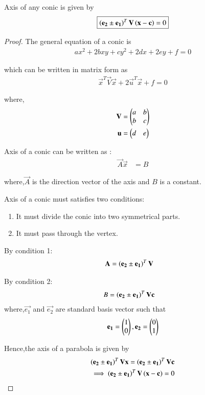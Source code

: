 \documentclass[journal,12pt,twocolumn]{IEEEtran}
\begin{document}
\begin{lemma}
Axis of any conic is given by
\begin{align}
    \boxed{\left(\mathbf{e_2} \pm \mathbf{e_1}\right)^T\mathbf{V}\left(\mathbf{x}-\mathbf{c}\right) = 0}
\end{align}

\end{lemma}
\begin{proof}
The general equation of a conic is
\begin{align}
  ax^2+2bxy+cy^2+2dx+2ey+f=0
\end{align}

which can be written in matrix form as
\begin{align}
    \vec{x}^T\vec{V}\vec{x} + 2\vec{u}^T\vec{x} + f =0
\end{align}

where,
\begin{align}
    \mathbf{V} &=\begin{pmatrix}a & b \\ b& c\end{pmatrix}
    \\
    \mathbf{u} &= \begin{pmatrix}d & e\end{pmatrix}
\end{align}

Axis of a conic can be written as :
\begin{align}
    \vec{A}\vec{x} &= B
\end{align}

where,$\vec{A}$ is the direction vector of the axis and $B$ is a constant.

Axis of a conic must satisfies two conditions:
\begin{enumerate}
    \item  It must divide the conic into two symmetrical parts. 
    \item  It must pass through the vertex.
\end{enumerate}

By condition 1:
\begin{align}
    \mathbf{A} &= \left(\mathbf{e_2} \pm \mathbf{e_1}\right)^T\mathbf{V}
\end{align}

By condition 2:
\begin{align}
    B &= \left(\mathbf{e_2} \pm \mathbf{e_1}\right)^T\mathbf{V}\mathbf{c}
\end{align}
where,$\vec{e_1}$ and $\vec{e_2}$ are standard basis vector such that
\begin{align}
    \mathbf{e_1}=\begin{pmatrix}1 \\0\end{pmatrix},\mathbf{e_2}=\begin{pmatrix}0 \\ 1\end{pmatrix}
\end{align}

Hence,the axis of a parabola is given by
\begin{align}
    \left(\mathbf{e_2} \pm \mathbf{e_1}\right)^T\mathbf{V}\mathbf{x} = \left(\mathbf{e_2} \pm \mathbf{e_1}\right)^T\mathbf{V}\mathbf{c}
    \\
    \implies \left(\mathbf{e_2} \pm \mathbf{e_1}\right)^T\mathbf{V}\left(\mathbf{x}-\mathbf{c}\right) = 0
\end{align}
\end{proof}
\end{document}
